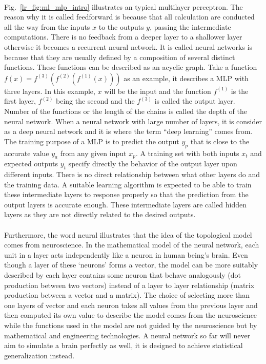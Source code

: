 \paragraph{}
Fig.~\ref{lr_fig:ml_mlp_intro} illustrates an typical multilayer perceptron.
The reason why it is called feedforward is because that all calculation are conducted all the way from the inputs $x$ to the outputs $y$, passing the intermediate computations.
There is no feedback from a deeper layer to a shallower layer otherwise it becomes a recurrent neural network.
It is called neural networks is because that they are usually defined by a composition of several distinct functions.
These functions can be described as an acyclic graph.
Take a function $f(x) = f^{(3)}(f^{(2)}(f^{(1)}(x)))$ as an example, it describes a MLP with three layers.
In this example, $x$ will be the input and the function $f^{(1)}$ is the first layer, $f^{(2)}$ being the second and the $f^{(3)}$ is called the output layer.
Number of the functions or the length of the chains is called the depth of the neural network.
When a neural network with large number of layers, it is consider as a deep neural network and it is where the term ``deep learning'' comes from.
The training purpose of a MLP is to predict the output $y_p$ that is close to the accurate value $y_a$ from any given input $x_p$.
A training set with both inputs $x_t$ and expected outputs $y_t$ specify directly the behavior of the output layer upon different inputs.
There is no direct relationship between what other layers do and the training data.
A suitable learning algorithm is expected to be able to train these intermediate layers to response properly so that the prediction from the output layers is accurate enough.
These intermediate layers are called hidden layers as they are not directly related to the desired outputs.
\paragraph{}
Furthermore, the word neural illustrates that the idea of the topological model comes from neuroscience.
In the mathematical model of the neural network, each unit in a layer acts independently like a neuron in human being's brain.
Even though a layer of these `neurons' forms a vector, the model can be more suitably described by each layer contains some neuron that behave analogously (dot production between two vectors) instead of a layer to layer relationship (matrix production between a vector and a matrix).
The choice of selecting more than one layers of vector and each neuron takes all values from the previous layer and then computed its own value to describe the model comes from the neuroscience while the functions used in the model are not guided by the neuroscience but by mathematical and engineering technologies.
A neural network so far will never aim to simulate a brain perfectly as well, it is designed to achieve statistical generalization instead.


